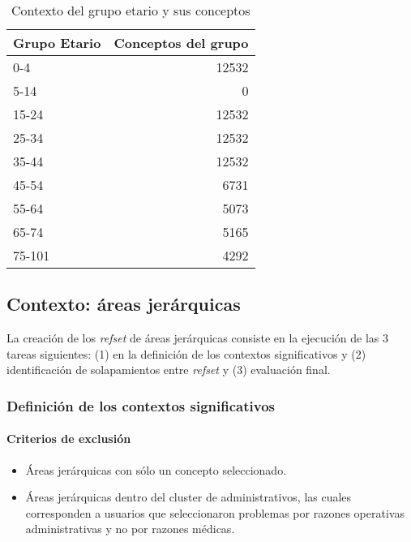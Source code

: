 \begin{table}[htb]
\centering
\caption{Contexto del grupo etario  y sus conceptos}
\label{grupo_etario_clus}
\begin{tabular}{@{}lr@{}}
\toprule
Grupo Etario & Conceptos del grupo \\ \midrule
0-4  & \num{12532} \\
5-14 & \num{0} \\
15-24  & \num{12532} \\
25-34  & \num{12532} \\
35-44 & \num{12532} \\
45-54  & \num{6731} \\
55-64  & \num{5073} \\
65-74  & \num{5165} \\
75-101 & \num{4292} \\ \bottomrule
\end{tabular}
\end{table}

\subsection{Contexto: áreas jerárquicas}
\label{par:contexto-areas}
La creación de los \textit{\acrshort{refset}} de áreas jerárquicas consiste en la ejecución de las 3 tareas siguientes: (1) en la definición de los contextos significativos y (2) identificación de solapamientos entre \textit{\acrshort{refset}} y (3) evaluación final. 

\subsubsection{Definición de los contextos significativos}

\paragraph{Criterios de exclusión}

\begin{itemize}
\item Áreas jerárquicas con sólo un concepto seleccionado.
\item Áreas jerárquicas dentro del cluster de administrativos, las cuales corresponden a usuarios que seleccionaron problemas por razones operativas administrativas y no por razones médicas.
\end{itemize}

